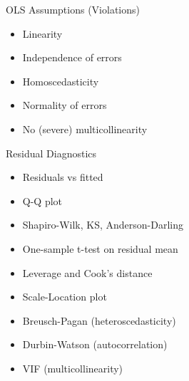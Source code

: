 \documentclass[aspectratio=169,10pt]{beamer}
\begin{document}
\begin{frame}[t]{OLS Assumptions (Violations)}
\begin{itemize}
\item Linearity
\item Independence of errors
\item Homoscedasticity
\item Normality of errors
\item No (severe) multicollinearity
\end{itemize}
\end{frame}

\begin{frame}[t]{Residual Diagnostics}
\begin{itemize}
\item Residuals vs fitted
\item Q-Q plot
\item Shapiro-Wilk, KS, Anderson-Darling
\item One-sample t-test on residual mean
\item Leverage and Cook's distance
\item Scale-Location plot
\item Breusch-Pagan (heteroscedasticity)
\item Durbin-Watson (autocorrelation)
\item VIF (multicollinearity)
\end{itemize}
\end{frame}
\end{document}
